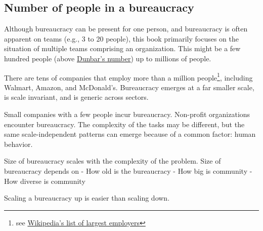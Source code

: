 \subsection{Number of people in a bureaucracy}

Although bureaucracy can be present for one person, and bureaucracy is often apparent on teams (e.g., 3 to 20 people), this book primarily focuses on the situation of multiple teams comprising an organization. This might be a few hundred people (above \href{https://en.wikipedia.org/wiki/Dunbar's_number}{Dunbar's number}) up to millions of people. 

There are tens of companies that employ more than a million people\footnote{see \href{https://en.wikipedia.org/wiki/List_of_largest_employers}{Wikipedia's list of largest employers}}, including Walmart, Amazon, and McDonald's. Bureaucracy emerges at a far smaller scale, is scale invariant, and is generic across sectors. 

Small companies with a few people incur bureaucracy. Non-profit organizations encounter bureaucracy. The complexity of the tasks may be different, but the same scale-independent patterns can emerge because of a common factor: human behavior.

Size of bureaucracy scales with the complexity of the problem. 
Size of bureaucracy depends on 
- How old is the bureaucracy 
- How big is community
- How diverse is community


Scaling a bureaucracy up is easier than scaling down.
